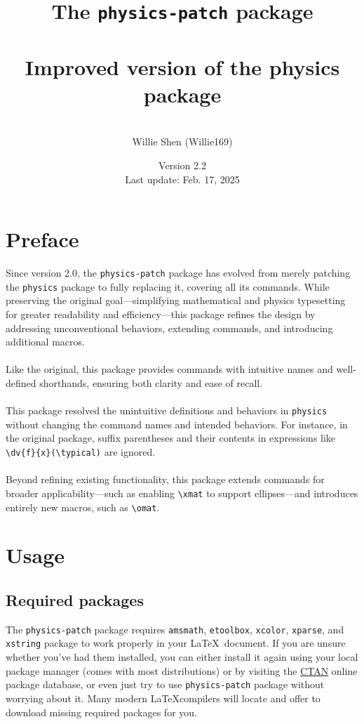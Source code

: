 \documentclass[a4paper,12pt]{article}
\title{The \texttt{physics-patch} package\\\mbox{}\\\textnormal{\large Improved version of the physics package}}
\author{\mbox{}\\Willie Shen (Willie169)}
\date{Version 2.2\\\textnormal{Last update: Feb. 17, 2025}}
\renewcommand{\maketitle}{
\begin{titlepage}
\begin{center}
\vspace*{\fill}
{\huge \bfseries \thetitle\par}
\vskip 1.5em
{\Large \theauthor\par}
\vskip 1em
{\large \thedate\par}
\vspace*{\fill}
\end{center}
\end{titlepage}
}
\begin{document}
\onehalfspacing\thispagestyle{empty}\Needspace{1\textheight}\maketitle\setcounter{page}{1}\Needspace{1\textheight}\tableofcontents\Needspace{1\textheight}\setcounter{page}{1}
\section{Preface}
Since version 2.0, the \texttt{physics-patch} package has evolved from merely patching the \texttt{physics} package to fully replacing it, covering all its commands. While preserving the original goal—simplifying mathematical and physics typesetting for greater readability and efficiency—this package refines the design by addressing unconventional behaviors, extending commands, and introducing additional macros.\\\\
Like the original, this package provides commands with intuitive names and well-defined shorthands, ensuring both clarity and ease of recall.\\\\
This package resolved the unintuitive definitions and behaviors in \texttt{physics} without changing the command names and intended behaviors. For instance, in the original package, suffix parentheses and their contents in expressions like \verb|\dv{f}{x}(\typical)| are ignored.\\\\
Beyond refining existing functionality, this package extends commands for broader applicability—such as enabling \verb|\xmat| to support ellipses—and introduces entirely new macros, such as \verb|\omat|.
\section{Usage}
\subsection{Required packages}
The \texttt{physics-patch} package requires \texttt{amsmath}, \texttt{etoolbox}, \texttt{xcolor}, \texttt{xparse}, and \texttt{xstring} package to work properly in your \LaTeX~document. If you are unsure whether you've had them installed, you can either install it again using your local package manager (comes with most distributions) or by visiting the \href{http://www.ctan.org}{CTAN} online package database, or even just try to use \texttt{physics-patch} package without worrying about it. Many modern \LaTeX compilers will locate and offer to download missing required packages for you.
\end{document}
